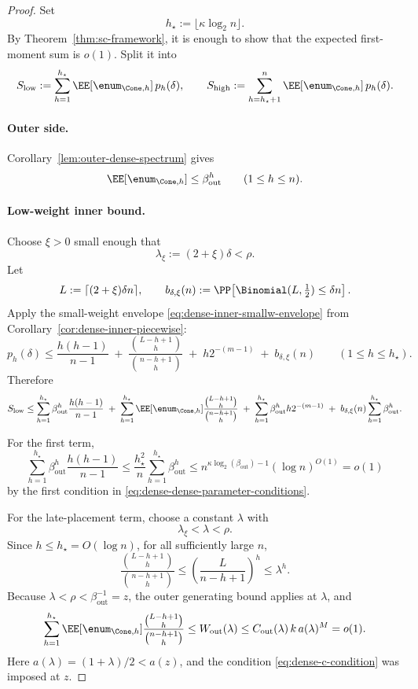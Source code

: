 \begin{proof}
Set
\[
h_\star:=\lfloor \kappa\log_2 n\rfloor.
\]
By Theorem~\ref{thm:sc-framework}, it is enough to show that the expected first-moment sum is \(o(1)\).  Split it into
\[
S_{\mathrm{low}}
:=
\sum_{h=1}^{h_\star} \EE[\enum_{\Cone,h}]\,p_h(\delta),
\qquad
S_{\mathrm{high}}
:=
\sum_{h=h_\star+1}^{n} \EE[\enum_{\Cone,h}]\,p_h(\delta).
\]

\paragraph{Outer side.}
Corollary~\ref{lem:outer-dense-spectrum} gives
\[
\EE[\enum_{\Cone,h}] \le \beta_{\mathrm{out}}^h
\qquad (1\le h\le n).
\]

\paragraph{Low-weight inner bound.}
Choose \(\xi>0\) small enough that
\[
\lambda_\xi:=(2+\xi)\delta<\rho.
\]
Let
\[
L:=\lceil(2+\xi)\delta n\rceil,
\qquad
b_{\delta,\xi}(n):=
\PP\!\left[\Binomial(L,\tfrac12)\le \delta n\right].
\]
Apply the small-weight envelope \eqref{eq:dense-inner-smallw-envelope} from
Corollary~\ref{cor:dense-inner-piecewise}:
\[
p_h(\delta)
\le
\frac{h(h-1)}{n-1}
\;+\;
\frac{\binom{L-h+1}{h}}{\binom{n-h+1}{h}}
\;+\;
h2^{-(m-1)}
\;+\;
b_{\delta,\xi}(n)
\qquad (1\le h\le h_\star).
\]
Therefore
\[
S_{\mathrm{low}}
\le
\sum_{h=1}^{h_\star}\beta_{\mathrm{out}}^h\frac{h(h-1)}{n-1}
\;+\;
\sum_{h=1}^{h_\star}\EE[\enum_{\Cone,h}]
\frac{\binom{L-h+1}{h}}{\binom{n-h+1}{h}}
\;+\;
\sum_{h=1}^{h_\star}\beta_{\mathrm{out}}^h h2^{-(m-1)}
\;+\;
b_{\delta,\xi}(n)\sum_{h=1}^{h_\star}\beta_{\mathrm{out}}^h.
\]

For the first term,
\[
\sum_{h=1}^{h_\star}\beta_{\mathrm{out}}^h\frac{h(h-1)}{n-1}
\le
\frac{h_\star^2}{n}\sum_{h=1}^{h_\star}\beta_{\mathrm{out}}^h
\le
n^{\kappa\log_2(\beta_{\mathrm{out}})-1}(\log n)^{O(1)}
=o(1)
\]
by the first condition in \eqref{eq:dense-dense-parameter-conditions}.

For the late-placement term, choose a constant \(\lambda\) with
\[
\lambda_\xi<\lambda<\rho.
\]
Since \(h\le h_\star=O(\log n)\), for all sufficiently large \(n\),
\[
\frac{\binom{L-h+1}{h}}{\binom{n-h+1}{h}}
\le
\left(\frac{L}{n-h+1}\right)^h
\le
\lambda^h .
\]
Because \(\lambda<\rho<\beta_{\mathrm{out}}^{-1}=z\), the outer generating
bound applies at \(\lambda\), and
\[
\sum_{h=1}^{h_\star}\EE[\enum_{\Cone,h}]
\frac{\binom{L-h+1}{h}}{\binom{n-h+1}{h}}
\le
W_{\mathrm{out}}(\lambda)
\le
C_{\mathrm{out}}(\lambda)\,k\,a(\lambda)^M
=o(1).
\]
Here \(a(\lambda)=(1+\lambda)/2<a(z)\), and the condition
\eqref{eq:dense-c-condition} was imposed at \(z\).


\end{proof}
